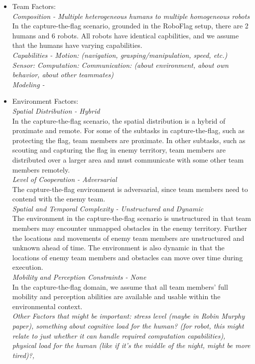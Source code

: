 \documentclass[letterpaper, 10 pt, conference]{ieeeconf}  %
\theoremstyle{definition}
\begin{document}
\begin{enumerate}
\begin{enumerate}
\begin{itemize}
        \item Team Factors:\\
        \textit{Composition - Multiple heterogeneous humans to multiple homogeneous robots}\\
        In the capture-the-flag scenario, grounded in the RoboFlag setup, there are 2 humans and 6 robots. All robots have identical capbilities, and we assume that the humans have varying capabilities. \\
        \textit{Capabilities - Motion: (navigation, grasping/manipulation, speed, etc.) Sensor: Computation: Communication: (about environment, about own behavior, about other teammates)}\\
        \textit{Modeling -}\\
        
        \item Environment Factors: \\
        \textit{Spatial Distribution - Hybrid}\\
        In the capture-the-flag scenario, the spatial distribution is a hybrid of proximate and remote. For some of the subtasks in capture-the-flag, such as protecting the flag, team members are proximate. In other subtasks, such as scouting and capturing the flag in enemy territory, team members are distributed over a larger area and must communicate with some other team members remotely. \\
        \textit{Level of Cooperation - Adversarial}\\
        The capture-the-flag environment is adversarial, since team members need to contend with the enemy team.\\
        \textit{Spatial and Temporal Complexity - Unstructured and Dynamic}\\
        The environment in the capture-the-flag scenario is unstructured in that team members may encounter unmapped obstacles in the enemy territory. Further the locations and movements of enemy team members are unstructured and unknown ahead of time. The environment is also dynamic in that the locations of enemy team members and obstacles can move over time during execution. \\
       \textit{Mobility and Perception Constraints - None}\\
       In the capture-the-flag domain, we assume that all team members' full mobility and perception abilities are available and usable within the environmental context. \\
       \textit{Other Factors that might be important: stress level (maybe in Robin Murphy paper), something about cognitive load for the human? (for robot, this might relate to just whether it can handle required computation capabilities), physical load for the human (like if it's the middle of the night, might be more tired)?, }
    \end{itemize}



\end{enumerate}
\end{enumerate}
\end{document}
